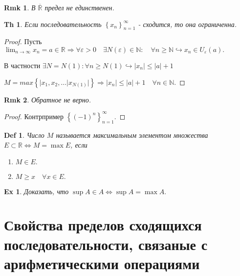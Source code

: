 \documentclass[a5paper, 10pt]{article}
\theoremstyle{plain}
\newtheorem*{theorem}{Th}
\newtheorem{definition}{Def}
\newtheorem*{remark}{Rmk}
\newtheorem{exersise}{Ex}
\newcommand{\N}{\mathbb N}
\newcommand{\R}{\mathbb R}
\newcommand{\eps}{\varepsilon}
\newcommand{\Ro}{\overline{\mathbb R}}
\newcommand{\hrarrow}{\hookrightarrow}
\newcommand{\Rarrow}{\Rightarrow}
\newcommand{\Lrarrow}{\Leftrightarrow}
\begin{document}
    \begin{remark}
        В $ \Ro $ предел не единственен.
    \end{remark}

    \begin{theorem}
        Если последовательность $ \left\{x_n \right\}_{n = 1}^{\infty} $ - сходится, то
        она ограниченна.
    \end{theorem}

    \begin{proof}
        Пусть $ \lim_{n \to \infty} x_n = a \in \R \Rarrow
        \forall \eps > 0 \quad \exists N(\eps) \in \N: \quad \forall n \geq \N \hrarrow
        x_n \in U_{\eps}(a). $

        В частности $ \exists N = N(1): \forall n \geq N(1) \hrarrow |x_n| \leq |a| + 1 $

        $ M = max \left\{ |x_1, x_2, \dots |x_{N(1)}| \right\} \Rarrow
        \left| x_n \right| \leq \left| a \right| + 1 \quad \forall n \in \N. $
    \end{proof}

    \begin{remark}
        Обратное не верно.
    \end{remark}

    \begin{proof}
        Контрпример $ \left\{ (-1)^{n} \right\}_{n = 1}^{\infty}. $
    \end{proof}

    \begin{definition}
        Число $ M $ называется максимальным элементом множества $ E \subset \R
        \Lrarrow M = \max E $, если

        \begin{enumerate}
            \item $ M \in E. $
            \item $ M \geq x \quad \forall x \in E. $
        \end{enumerate}
    \end{definition}

    \begin{exersise}
        Доказать, что $ \sup{A} \in A \Lrarrow \sup{A} = \max{A}. $
    \end{exersise}

    \section{Свойства пределов сходящихся последовательности, связаные с арифметическими
        операциями}
\end{document}
